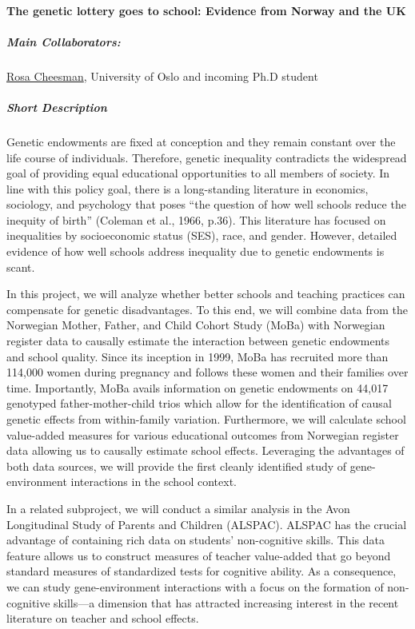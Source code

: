 \documentclass[11pt, a4paper]{article}
\begin{document}
\paragraph{The genetic lottery goes to school: Evidence from Norway and the UK}

\subparagraph{Main Collaborators:} \href{https://www.sv.uio.no/psi/english/people/academic/rosacg/index.html}{Rosa Cheesman}, University of Oslo and incoming Ph.D student

\subparagraph{Short Description} Genetic endowments are fixed at conception and they remain constant over the life course of individuals. Therefore, genetic inequality contradicts the widespread goal of providing equal educational opportunities to all members of society. In line with this policy goal, there is a long-standing literature in economics, sociology, and psychology that poses “the question of how well schools reduce the inequity of birth” (Coleman et al., 1966, p.36). This literature has focused on inequalities by socioeconomic status (SES), race, and gender. However, detailed evidence of how well schools address inequality due to genetic endowments is scant.

In this project, we will analyze whether better schools and teaching practices can compensate for genetic disadvantages. To this end, we will combine data from the Norwegian Mother, Father, and Child Cohort Study (MoBa) with Norwegian register data to causally estimate the interaction between genetic endowments and school quality. Since its inception in 1999, MoBa has recruited more than 114,000 women during pregnancy and follows these women and their families over time. Importantly, MoBa avails information on genetic endowments on 44,017 genotyped father-mother-child trios which allow for the identification of causal genetic effects from within-family variation. Furthermore, we will calculate school value-added measures for various educational outcomes from Norwegian register data allowing us to causally estimate school effects. Leveraging the advantages of both data sources, we will provide the first cleanly identified study of gene-environment interactions in the school context.

In a related subproject, we will conduct a similar analysis in the Avon Longitudinal Study of Parents and Children (ALSPAC). ALSPAC has the crucial advantage of containing rich data on students' non-cognitive skills. This data feature allows us to construct measures of teacher value-added that go beyond standard measures of standardized tests for cognitive ability. As a consequence, we can study gene-environment interactions with a focus on the formation of non-cognitive skills---a dimension that has attracted increasing interest in the recent literature on teacher and school effects.  
\end{document}
